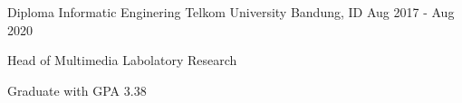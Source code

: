 

\begin{cventries}

  \cventry
    {Diploma Informatic Enginering} %
    {Telkom University} %
    {Bandung, ID} %
    {Aug 2017 - Aug 2020} %
    {
      \begin{cvitems} %
        \item {Head of Multimedia Labolatory Research}
        \item {Graduate with GPA 3.38}
      \end{cvitems}
    }
 
\end{cventries}
